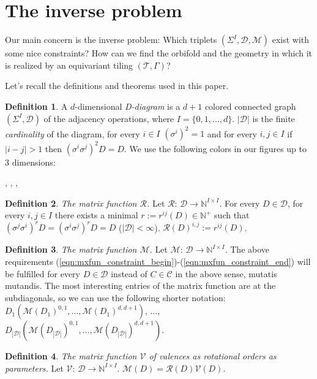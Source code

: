 \documentclass[12pt,a4paper]{article}
\numberwithin{equation}{section}
\theoremstyle{plain}%
\theoremstyle{definition}
\newtheorem{defn}{Definition}[section]
\theoremstyle{remark}
\begin{document}
\section{The inverse problem}
Our main concern is the inverse problem: Which triplets
$(\Sigma^I,\mathcal{D},\mathcal{M})$ exist with some nice constraints? How
can we find the orbifold and the geometry in which it is realized by an equivariant tiling
$(\mathcal{T},\Gamma)$?

Let's recall the definitions and theorems used in this paper.
\begin{defn}
  \label{def:D-diag}
  A $d$-dimensional {\em D-diagram} is a $d+1$ colored connected graph $(\Sigma^I,\mathcal{D})$ of the
  adjacency operations, where $I=\{0, 1, \ldots, d\}$.
  $|\mathcal{D}|$ is the finite {\em cardinality} of the diagram, for every $i\in
  I$ $(\sigma^i)^2=1$ and for every $i,j\in I$ if $|i-j|>1$ then
  $(\sigma^i\sigma^j)^2D=D$. We use the following colors in our figures up to 3
  dimensions:

  \usebox{\LegendVertex}, \usebox{\LegendEdge}, \usebox{\LegendFace},
  \usebox{\LegendBody}
\end{defn}

\begin{defn}
  {\em The matrix function $\mathcal{R}$.}
  Let $\mathcal{R}$: $\mathcal{D} \rightarrow \mathbb{N}^{I\times I}$.
  For every $D\in\mathcal{D}$, for every $i,j\in I$ there exists a minimal
  $r:=r^{ij}(D)\in \mathbb{N}^+$ such that
  $(\sigma^j\sigma^i)^rD=(\sigma^i\sigma^j)^rD=D$ ($|\mathcal{D}|<\infty$).
  $\mathcal{R}(D)^{i,j}:=r^{ij}(D)$.
\end{defn}
  
\begin{defn}
  {\em The matrix function $\mathcal{M}$.}
  Let $\mathcal{M}$: $\mathcal{D} \rightarrow \mathbb{N}^{I\times I}$.
  The above requirements
  (\ref{eqn:mxfun_constraint_begin})-(\ref{eqn:mxfun_constraint_end}) will be
  fulfilled for every $D\in\mathcal{D}$ instead of $C\in\mathcal{C}$ in the
  above sense, mutatis mutandis.
  The most interesting entries of the matrix function are at the subdiagonals, so
  we can use the following shorter notation:
  $D_1(\mathcal{M}(D_1)^{0,1},\ldots,\mathcal{M}(D_1)^{d,d+1})$, $\ldots$,
  $D_{|\mathcal{D}|}(\mathcal{M}(D_{|\mathcal{D}|})^{0,1},\ldots,\mathcal{M}(D_{|\mathcal{D}|})^{d,d+1})$.
\end{defn}

\begin{defn}
  {\em The matrix function $\mathcal{V}$ of valences as rotational orders
  as parameters.}
  Let $\mathcal{V}$: $\mathcal{D} \rightarrow \mathbb{N}^{I\times I}$.
  $\mathcal{M}(D)=\mathcal{R}(D)\mathcal{V}(D)$.
\end{defn}
\end{document}
